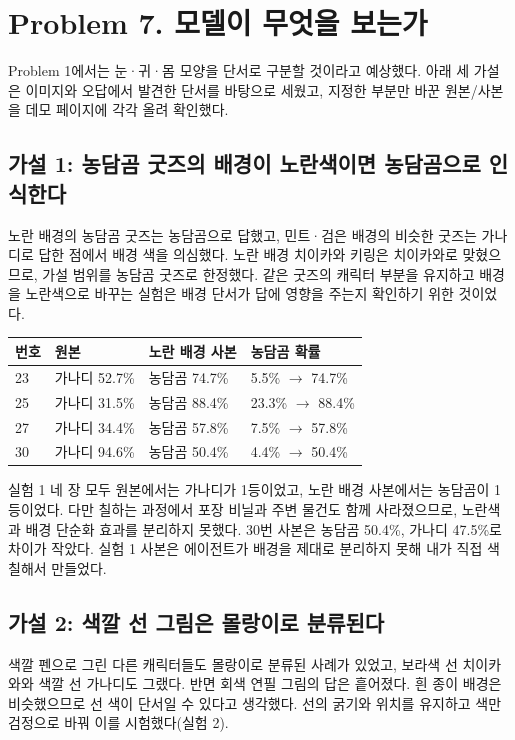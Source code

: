 \documentclass[11pt]{article}
\begin{document}
\section*{Problem 7. 모델이 무엇을 보는가}

Problem 1에서는 눈·귀·몸 모양을 단서로 구분할 것이라고 예상했다. 아래 세
가설은 이미지와 오답에서 발견한 단서를 바탕으로 세웠고, 지정한 부분만
바꾼 원본/사본을 데모 페이지에 각각 올려 확인했다.

\subsection*{가설 1: 농담곰 굿즈의 배경이 노란색이면 농담곰으로 인식한다}
노란 배경의 농담곰 굿즈는 농담곰으로 답했고, 민트·검은 배경의 비슷한
굿즈는 가나디로 답한 점에서 배경 색을 의심했다. 노란 배경 치이카와
키링은 치이카와로 맞혔으므로, 가설 범위를 농담곰 굿즈로 한정했다.
같은 굿즈의 캐릭터 부분을 유지하고 배경을 노란색으로 바꾸는 실험은
배경 단서가 답에 영향을 주는지 확인하기 위한 것이었다.

\begin{center}
\begin{tabular}{llll}
\toprule
번호 & 원본 & 노란 배경 사본 & 농담곰 확률 \\
\midrule
23 & 가나디 52.7\% & 농담곰 74.7\% & 5.5\% $\rightarrow$ 74.7\% \\
25 & 가나디 31.5\% & 농담곰 88.4\% & 23.3\% $\rightarrow$ 88.4\% \\
27 & 가나디 34.4\% & 농담곰 57.8\% & 7.5\% $\rightarrow$ 57.8\% \\
30 & 가나디 94.6\% & 농담곰 50.4\% & 4.4\% $\rightarrow$ 50.4\% \\
\bottomrule
\end{tabular}
\end{center}

실험 1 네 장 모두 원본에서는 가나디가 1등이었고, 노란 배경 사본에서는
농담곰이 1등이었다. 다만 칠하는 과정에서 포장 비닐과 주변 물건도 함께
사라졌으므로, 노란색과 배경 단순화 효과를 분리하지 못했다. 30번 사본은
농담곰 50.4\%, 가나디 47.5\%로 차이가 작았다.
실험 1 사본은 에이전트가 배경을 제대로 분리하지 못해 내가 직접 색칠해서 만들었다.

\subsection*{가설 2: 색깔 선 그림은 몰랑이로 분류된다}
색깔 펜으로 그린 다른 캐릭터들도 몰랑이로 분류된 사례가 있었고,
보라색 선 치이카와와 색깔 선 가나디도 그랬다. 반면 회색 연필 그림의 답은
흩어졌다. 흰 종이 배경은 비슷했으므로 선 색이 단서일 수
있다고 생각했다. 선의 굵기와 위치를 유지하고 색만 검정으로 바꿔 이를
시험했다(실험 2).
\end{document}
